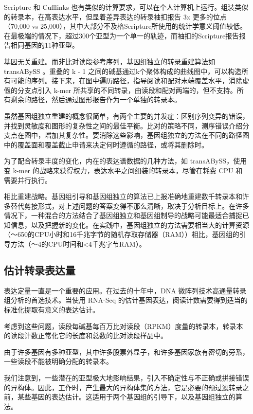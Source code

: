 Scripture 和 Cufflinks 也有类似的计算要求，可以在个人计算机上运行。组装类似的转录本，在高表达水平，但显着差异表达的转录袖扣报告 3x 更多的位点（70,000 vs 25,000），其中大部分不及格Scripture所使用的统计学意义阈值较低。在最极端的情况下，超过300个亚型为一个单一的轨迹，而袖扣的Scripture报告报告相同基因的11种亚型。

基因无关重建。而非比对读段参考序列，基因组独立的转录重建算法如 transABySS 。重叠的 k  -  1 之间的碱基通过k个聚体构成的曲线图中，可以构造所有可能的序列。接下来，在图中遍历路径，指导阅读和配对末端覆盖水平，消除虚假的分支点引入 k-mer 所共享的不同转录，由读段和配对两端的，但不支持。所有剩余的路径，然后通过图形报告​​作为一个单独的转录本。

虽然基因组独立重建的概念很简单，有两个主要的并发症：区别序列变异的错误，并找到灵敏度和图形的复杂性之间的最佳平衡。比对的策略不同，测序错误介绍分支点在图中，增加其复杂性。要消除这些影响，基因组独立的方法在不同的路径图中的覆盖面和覆盖截止申请来决定何时遵循的路径，或将其删除时。

为了配合转录丰度的变化，内在的表达谱数据的几种方法，如 transABySS，使用变 k-mer 的战略来获得权力，表达水平之间组装的转录本，尽管在耗费 CPU 和需要并行执行。

相比重建战略。基因组引导和基因组独立的算法已上报准确地重建数千转录本和许多替代剪接形式，对上述问题的答案变得不那么清晰，取决于分析目标上。在许多情况下，一种混合​​的方法结合了基因组独立和基因组制导的战略可能最适合捕捉已知信息，以及把握新的变化。在实践中，基因组独立的方法需要相当大的计算资源（〜650的CPU小时和16千兆字节的随机存取存储器（RAM））相比，基因组的引导方法（〜4的CPU时间和<4千兆字节RAM）。

\subsection{估计转录表达量}

表达定量一直是一个重要的应用。在过去的十年中，DNA 微阵列技术高通量转录组分析的首选技术。当使用 RNA-Seq 的估计基因表达，阅读计数需要得到适当的标准化提取有意义的表达估计。

考虑到这些问题，读段每碱基每百万比对读段（RPKM）度量的转录本，转录本的读段计数正常化它的长度和总数的比对读段样品中。

由于许多基因有多种亚型，其中许多股票外显子，和许多基因家族有密切的旁系，一些读段不能被明确分配的转录本。

我们注意到，一些潜在的亚型极大地影响结果，引入不确定性与不正确或拼接错误的异构体。因此，工作时，产生最大的异构体集的方法，它是必要的预过滤转录之前，某些基因的表达估计。这适用于两个基因组的引导下，以及基因组独立的算法。

